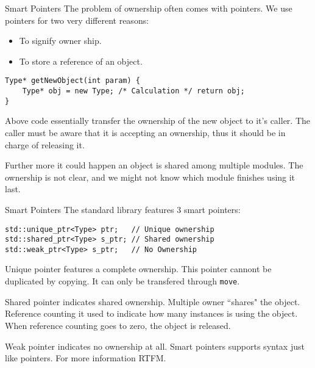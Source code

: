 \begin{frame}[fragile]{Smart Pointers}
The problem of ownership often comes with pointers. We use pointers for two very different reasons:
\begin{itemize}
	\item To signify owner ship.
	\item To store a reference of an object.
\end{itemize}
\begin{verbatim}
Type* getNewObject(int param) {
    Type* obj = new Type; /* Calculation */ return obj;
}
\end{verbatim}
Above code essentially transfer the ownership of the new object to it's caller. The caller must be aware that it is accepting an ownership, thus it should be in charge of releasing it. 

\vspace{0.05in}
Further more it could happen an object is shared among multiple modules. The ownership is not clear, and we might not know which module finishes using it last. 
\end{frame}

\begin{frame}[fragile]{Smart Pointers}
The standard library features 3 smart pointers:
\begin{verbatim}
std::unique_ptr<Type> ptr;   // Unique ownership
std::shared_ptr<Type> s_ptr; // Shared ownership
std::weak_ptr<Type> s_ptr;   // No Ownership
\end{verbatim} 
Unique pointer features a complete ownership. This pointer cannont be duplicated by copying. It can only be transfered through \texttt{move}.

Shared pointer indicates shared ownership. Multiple owner ``shares" the object. Reference counting it used to indicate how many instances is using the object. When reference counting goes to zero, the object is released.

Weak pointer indicates no ownership at all. Smart pointers supports syntax just like pointers. For more information RTFM. 
\end{frame}
